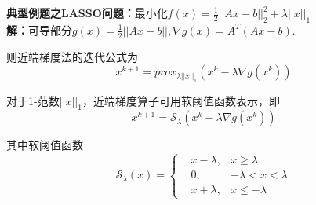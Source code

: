 \documentclass{article}
\begin{document}
\textbf{典型例题之LASSO问题：}最小化$f(x)=\frac{1}{2}||Ax-b||^2_2+\lambda||x||_1$\\

\textbf{解：}可导部分$g(x)=\frac{1}{2}||Ax-b||,\nabla g(x)=A^T(Ax-b)$.

则近端梯度法的迭代公式为
\begin{equation*}
    x^{k+1}=prox_{\lambda||x||_1}(x^k-\lambda\nabla g(x^k))    
\end{equation*}

对于1-范数$||x||_1$，近端梯度算子可用软阈值函数表示，即
\begin{equation*}
    x^{k+1}=\mathcal{S}_{\lambda}(x^k-\lambda\nabla g(x^k))
\end{equation*}

其中软阈值函数
\begin{equation*}
    \mathcal{S}_\lambda(x)=\left\{
    \begin{aligned}
    &x-\lambda,&x\geq\lambda\\
    &0,&-\lambda<x<\lambda\\
    &x+\lambda,&x\leq -\lambda
    \end{aligned}
    \right.
\end{equation*}
\end{document}

